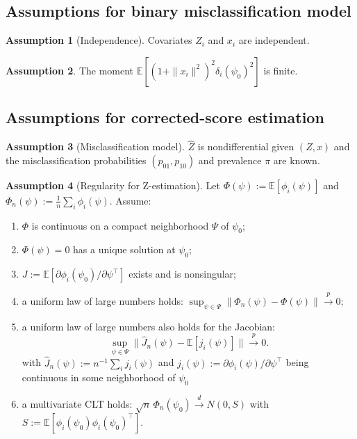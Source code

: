 \documentclass[11pt]{article}
\theoremstyle{definition}
\newtheorem{assumption}{Assumption}
\theoremstyle{remark}
\newcommand{\E}{\mathbb{E}}
\newcommand{\toP}{\xrightarrow{\,p\,}}
\newcommand{\tod}{\xrightarrow{\,d\,}}
\newcommand{\norm}[1]{\left\lVert #1 \right\rVert}
\begin{document}
\subsection{Assumptions for binary misclassification model}

\begin{assumption}[Independence]\label{ass:indep}
    Covariates $Z_i$ and $x_i$ are independent.
\end{assumption}

\begin{assumption}
    The moment $\E [(1+\|x_i\|^2)^2\delta_i (\psi_0)^2]$ is finite.
\end{assumption}

\subsection{Assumptions for corrected-score estimation}

\begin{assumption}[Misclassification model]\label{ass:est_proba}
$\hat Z$ is nondifferential given $(Z,x)$ and the misclassification probabilities $(p_{01},p_{10})$ and prevalence $\pi$ are known.
\end{assumption}

\begin{assumption}[Regularity for Z-estimation]\label{ass:regularity}
Let $\Phi(\psi):=\E[\phi_i(\psi)]$ and $\Phi_n(\psi):=\frac{1}{n}\sum_i\phi_i(\psi)$. Assume:
\begin{enumerate}[label=(\roman*), leftmargin=1.6em]
\item $\Phi$ is continuous on a compact neighborhood $\Psi$ of $\psi_0$;
\item $\Phi(\psi)=0$ has a unique solution at $\psi_0$;
\item $J:=\E[\partial\phi_i(\psi_0)/\partial\psi^\top]$ exists and is nonsingular;
\item a uniform law of large numbers holds: $\sup_{\psi\in\Psi}\norm{\Phi_n(\psi)-\Phi(\psi)}\toP 0$;
\item a uniform law of large numbers also holds for the Jacobian: 
\[
\sup_{\psi\in\Psi}\big\|\hat J_n(\psi)-\E[j_i(\psi)]\big\|\toP 0.
\]
with $\hat J_n(\psi):=n^{-1}\sum_i j_i(\psi)$ and $j_i(\psi):=\partial\phi_i(\psi)/\partial\psi^\top$ being continuous in some neighborhood of $\psi_0$
\item a multivariate CLT holds: $\sqrt{n}\,\Phi_n(\psi_0)\tod N(0,S)$ with $S:=\E[\phi_i(\psi_0)\phi_i(\psi_0)^\top]$.
\end{enumerate}
\end{assumption}
\end{document}
